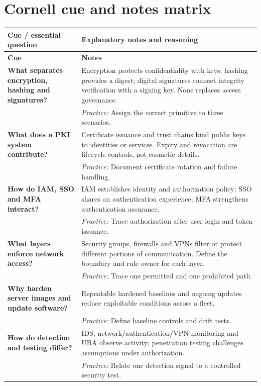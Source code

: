 \documentclass[10pt,letterpaper]{article}
\begin{document}
\section{Cornell cue and notes matrix}
\small\setlength{\LTleft}{0pt}\setlength{\LTright}{0pt plus 1fill}
\begin{longtable}{>{\RaggedRight\arraybackslash}p{}>{\RaggedRight\arraybackslash}p{}}
\toprule\textbf{Cue / essential question}&\textbf{Explanatory notes and reasoning}\\\midrule\endfirsthead\toprule\textbf{Cue}&\textbf{Notes}\\\midrule\endhead
\textbf{What separates encryption, hashing and signatures?} & Encryption protects confidentiality with keys; hashing provides a digest; digital signatures connect integrity verification with a signing key. None replaces access governance.\\[3pt]& \textcolor{petrol}{\emph{Practice:} Assign the correct primitive to three scenarios.}\\[8pt]\midrule
\textbf{What does a PKI system contribute?} & Certificate issuance and trust chains bind public keys to identities or services. Expiry and revocation are lifecycle controls, not cosmetic details.\\[3pt]& \textcolor{petrol}{\emph{Practice:} Document certificate rotation and failure handling.}\\[8pt]\midrule
\textbf{How do IAM, SSO and MFA interact?} & IAM establishes identity and authorization policy; SSO shares an authentication experience; MFA strengthens authentication assurance.\\[3pt]& \textcolor{petrol}{\emph{Practice:} Trace authorization after user login and token issuance.}\\[8pt]\midrule
\textbf{What layers enforce network access?} & Security groups, firewalls and VPNs filter or protect different portions of communication. Define the boundary and rule owner for each layer.\\[3pt]& \textcolor{petrol}{\emph{Practice:} Trace one permitted and one prohibited path.}\\[8pt]\midrule
\textbf{Why harden server images and update software?} & Repeatable hardened baselines and ongoing updates reduce exploitable conditions across a fleet.\\[3pt]& \textcolor{petrol}{\emph{Practice:} Define baseline controls and drift tests.}\\[8pt]\midrule
\textbf{How do detection and testing differ?} & IDS, network/authentication/VPN monitoring and UBA observe activity; penetration testing challenges assumptions under authorization.\\[3pt]& \textcolor{petrol}{\emph{Practice:} Relate one detection signal to a controlled security test.}\\[8pt]\midrule
\end{longtable}\normalsize
\end{document}
